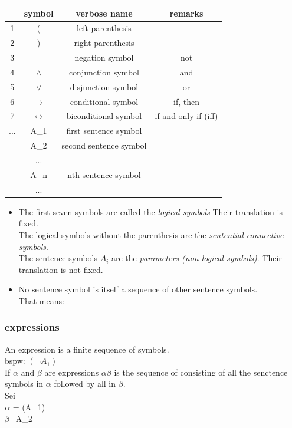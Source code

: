 \documentclass[12pt, letterpaper]{article}
\begin{document}
\begin{tabular}{c|c|c|c } 
 \hline
  &symbol & verbose name& remarks \\ 
  \hline
	1 &( & left parenthesis &  \\ 
	2 &) & right parenthesis &\\ 
	 3 &$\neg$&negation symbol& not\\
	 4&$\land$&conjunction symbol& and\\
	 5&$\lor$&disjunction symbol& or\\
	 6&$\rightarrow $&conditional symbol&if, then\\
	 7&$\leftrightarrow $&biconditional symbol & if and only if (iff)\\
	 ...&A_{1}& first sentence symbol& \\
	  &A_{2}& second sentence symbol&\\
	  &...&&\\
	  &A_{n}&nth sentence symbol&\\
	  &...&&\\

 \hline
\end{tabular}
\begin{itemize}
	\item The first seven symbols are called the \textit{logical symbols}	Their translation is fixed.\\
	
		The logical symbols without the parenthesis are the \textit{sentential connective symbols}.	\\
		The sentence symbols $A_{i}$ are the \textit{parameters (non logical symbols)}. Their translation is not fixed.
	\item No sentence symbol is itself a sequence of other sentence symbols.\\
		That means:
		

\end{itemize}
\newpage
\subsubsection{expressions}
\label{sec:expressions}
An expression is a finite sequence of symbols.\\
bspw: $(\neg A_{1})$\\
If $\alpha$ and $\beta$ are expressions $\alpha\beta$ is the sequence of consisting of all the senctence symbols in $\alpha$ followed by all in $\beta$.\\
Sei\\ $\alpha$ = (\neg A_{1})\\
$\beta$=A_{2}\\
\end{document}
